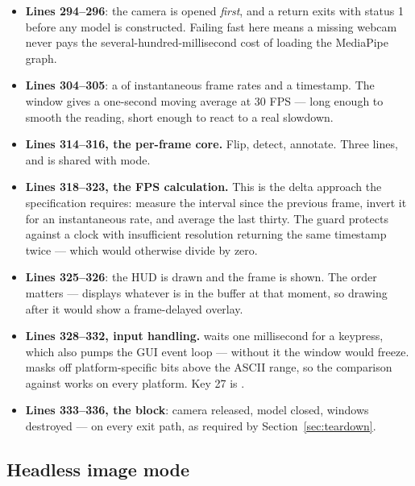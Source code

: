 \begin{itemize}
  \item \textbf{Lines 294--296}: the camera is opened \emph{first}, and a  return exits
        with status 1 before any model is constructed. Failing fast here means a missing webcam never
        pays the several-hundred-millisecond cost of loading the MediaPipe graph.
  \item \textbf{Lines 304--305}: a  of instantaneous frame rates and a
        timestamp. The window gives a one-second moving average at 30 FPS --- long enough to smooth
        the reading, short enough to react to a real slowdown.
  \item \textbf{Lines 314--316, the per-frame core.} Flip, detect, annotate. Three lines, and
         is shared with  mode.
  \item \textbf{Lines 318--323, the FPS calculation.} This is the  delta approach
        the specification requires: measure the interval since the previous frame, invert it for an
        instantaneous rate, and average the last thirty. The  guard protects
        against a clock with insufficient resolution returning the same timestamp twice --- which
        would otherwise divide by zero.
  \item \textbf{Lines 325--326}: the HUD is drawn and the frame is shown. The order matters ---
         displays whatever is in the buffer at that moment, so drawing after it would
        show a frame-delayed overlay.
  \item \textbf{Lines 328--332, input handling.}  waits one millisecond for a
        keypress, which also pumps the GUI event loop --- without it the window would freeze.
         masks off platform-specific bits above the ASCII range, so the comparison
        against  works on every platform. Key 27 is .
  \item \textbf{Lines 333--336, the  block}: camera released, model closed, windows
        destroyed --- on every exit path, as required by Section~\ref{sec:teardown}.
\end{itemize}

\subsection{Headless image mode}

\begin{codecard}

\end{codecard}

